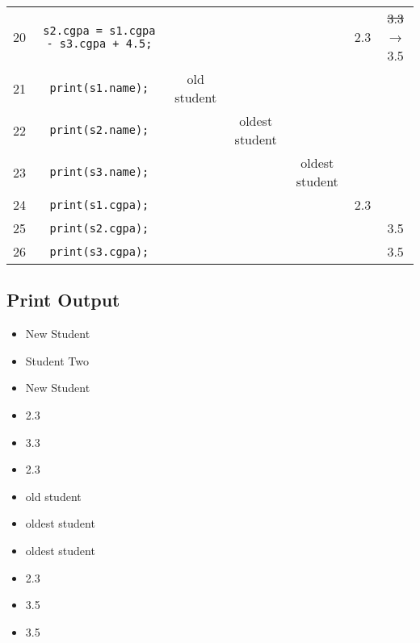 \documentclass{article}
\begin{document}
\begin{tabular}{|c|c|c|c|c|c|c|}
20 & \texttt{s2.cgpa = s1.cgpa - s3.cgpa + 4.5;} &  &  &  & 2.3 & \sout{3.3} → 3.5 \\
21 & \texttt{print(s1.name);} & old student &  &  &  &  \\
22 & \texttt{print(s2.name);} &  & oldest student &  &  &  \\
23 & \texttt{print(s3.name);} &  &  & oldest student &  &  \\
24 & \texttt{print(s1.cgpa);} &  &  &  & 2.3 &  \\
25 & \texttt{print(s2.cgpa);} &  &  &  &  & 3.5 \\
26 & \texttt{print(s3.cgpa);} &  &  &  &  & 3.5 \\
\hline
\end{tabular}

\vspace{1cm}

\subsection*{Print Output}

\begin{itemize}
  \item New Student
  \item Student Two
  \item New Student
  \item 2.3
  \item 3.3
  \item 2.3
  \item old student
  \item oldest student
  \item oldest student
  \item 2.3
  \item 3.5
  \item 3.5
\end{itemize}
\end{document}
